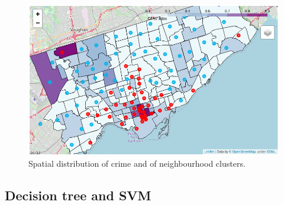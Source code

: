 \documentclass{article}
\begin{document}
\begin{figure}[ht]
\centering
 \includegraphics[width=\textwidth]{pics/clustercrime.png}
 \caption{Spatial distribution of crime and of neighbourhood clusters.}\label{fig:clustercrime}
\end{figure}

\subsection{Decision tree and SVM}
\end{document}
